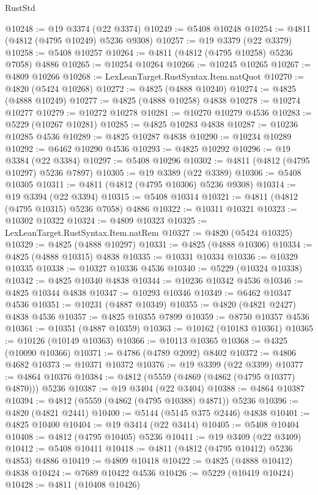 \begin{lexlean}{RustStd}
\begin{coremodule}
{\begin{coremodule}
{{{{{{{{{{{{{{{{{{{{{{{{{{{{{{{{{{{{{{{{{{{{{{{{{{{{{{{{{{{{{{{{{{{{{{{{{{{{{{{{@10248 := @19 @3374 (@22 @3374)
@10249 := @5408 @10248
@10254 := @4811 (@4812 (@4795 @10249) @5236 @9308)
@10257 := @19 @3379 (@22 @3379)
@10258 := @5408 @10257
@10264 := @4811 (@4812 (@4795 @10258) @5236 @7058) @4886
@10265 := @10254 @10264
@10266 := @10245 @10265
@10267 := @4809 @10266
@10268 := LexLeanTarget.RustSyntax.Item.natQuot
@10270 := @4820 (@5424 @10268)
@10272 := @4825 (@4888 @10240)
@10274 := @4825 (@4888 @10249)
@10277 := @4825 (@4888 @10258) @4838
@10278 := @10274 @10277
@10279 := @10272 @10278
@10281 := @10270 @10279 @4536
@10283 := @5229 (@10267 @10281)
@10285 := @4825 @10283 @4838
@10287 := @10236 @10285 @4536
@10289 := @4825 @10287 @4838
@10290 := @10234 @10289
@10292 := @6462 @10290 @4536
@10293 := @4825 @10292
@10296 := @19 @3384 (@22 @3384)
@10297 := @5408 @10296
@10302 := @4811 (@4812 (@4795 @10297) @5236 @7897)
@10305 := @19 @3389 (@22 @3389)
@10306 := @5408 @10305
@10311 := @4811 (@4812 (@4795 @10306) @5236 @9308)
@10314 := @19 @3394 (@22 @3394)
@10315 := @5408 @10314
@10321 := @4811 (@4812 (@4795 @10315) @5236 @7058) @4886
@10322 := @10311 @10321
@10323 := @10302 @10322
@10324 := @4809 @10323
@10325 := LexLeanTarget.RustSyntax.Item.natRem
@10327 := @4820 (@5424 @10325)
@10329 := @4825 (@4888 @10297)
@10331 := @4825 (@4888 @10306)
@10334 := @4825 (@4888 @10315) @4838
@10335 := @10331 @10334
@10336 := @10329 @10335
@10338 := @10327 @10336 @4536
@10340 := @5229 (@10324 @10338)
@10342 := @4825 @10340 @4838
@10344 := @10236 @10342 @4536
@10346 := @4825 @10344 @4838
@10347 := @10293 @10346
@10349 := @6462 @10347 @4536
@10351 := @10231 (@4887 @10349)
@10355 := @4820 (@4821 @2427) @4838 @4536
@10357 := @4825 @10355 @7899
@10359 := @8750 @10357 @4536
@10361 := @10351 (@4887 @10359)
@10363 := @10162 (@10183 @10361)
@10365 := @10126 (@10149 @10363)
@10366 := @10113 @10365
@10368 := @4325 (@10090 @10366)
@10371 := @4786 (@4789 @2092) @8402
@10372 := @4806 @4682
@10373 := @10371 @10372
@10376 := @19 @3399 (@22 @3399)
@10377 := @4864 @10376
@10384 := @4812 (@5559 (@4869 (@4862 (@4795 @10377) @4870))) @5236
@10387 := @19 @3404 (@22 @3404)
@10388 := @4864 @10387
@10394 := @4812 (@5559 (@4862 (@4795 @10388) @4871)) @5236
@10396 := @4820 (@4821 @2441)
@10400 := @5144 (@5145 @375 @2446) @4838
@10401 := @4825 @10400
@10404 := @19 @3414 (@22 @3414)
@10405 := @5408 @10404
@10408 := @4812 (@4795 @10405) @5236
@10411 := @19 @3409 (@22 @3409)
@10412 := @5408 @10411
@10418 := @4811 (@4812 (@4795 @10412) @5236 @4853) @4886
@10419 := @4809 @10418
@10422 := @4825 (@4888 @10412) @4838
@10424 := @7689 @10422 @4536
@10426 := @5229 (@10419 @10424)
@10428 := @4811 (@10408 @10426)
}}}}}}}}}}}}}}}}}}}}}}}}}}}}}}}}}}}}}}}}}}}}}}}}}}}}}}}}}}}}}}}}}}}}}}}}}}}}}}}}
\end{coremodule}}
\end{coremodule}
\end{lexlean}
